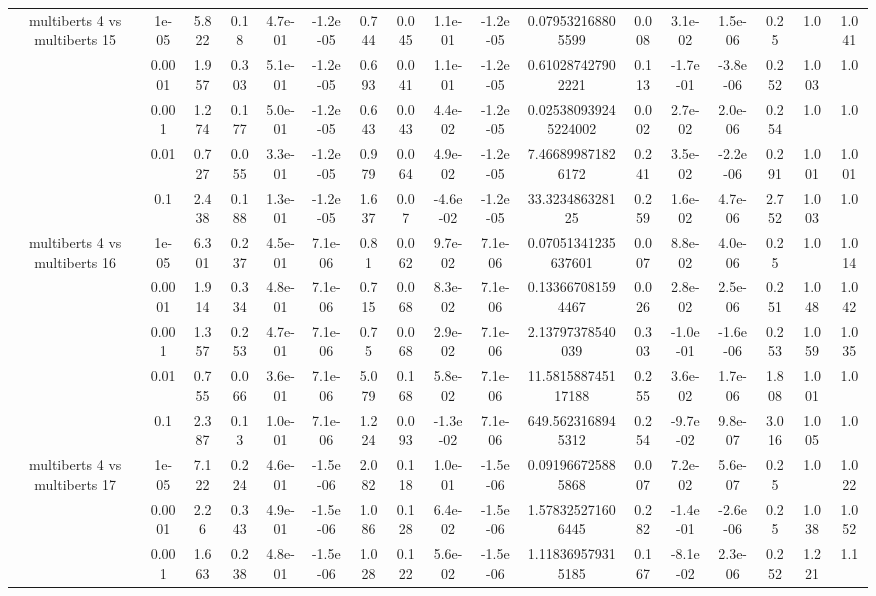 \begin{tabular}{|c|c|c|c|c|c|c|c|c|c|c|c|c|c|c|c|c|}
\hline
\multirow{5}{*}{multiberts 4 vs multiberts 15} & 1e-05 & 5.822 & 0.18 & 4.7e-01 & -1.2e-05 & 0.744 & 0.045 & 1.1e-01 & -1.2e-05 & 0.079532168805599 & 0.008 & 3.1e-02 & 1.5e-06 & 0.25 & 1.0 & 1.041 \\
 & 0.0001 & 1.957 & 0.303 & 5.1e-01 & -1.2e-05 & 0.693 & 0.041 & 1.1e-01 & -1.2e-05 & 0.610287427902221 & 0.113 & -1.7e-01 & -3.8e-06 & 0.252 & 1.003 & 1.0 \\
 & 0.001 & 1.274 & 0.177 & 5.0e-01 & -1.2e-05 & 0.643 & 0.043 & 4.4e-02 & -1.2e-05 & 0.025380939245224002 & 0.002 & 2.7e-02 & 2.0e-06 & 0.254 & 1.0 & 1.0 \\
 & 0.01 & 0.727 & 0.055 & 3.3e-01 & -1.2e-05 & 0.979 & 0.064 & 4.9e-02 & -1.2e-05 & 7.466899871826172 & 0.241 & 3.5e-02 & -2.2e-06 & 0.291 & 1.001 & 1.001 \\
 & 0.1 & 2.438 & 0.188 & 1.3e-01 & -1.2e-05 & 1.637 & 0.07 & -4.6e-02 & -1.2e-05 & 33.323486328125 & 0.259 & 1.6e-02 & 4.7e-06 & 2.752 & 1.003 & 1.0 \\
\hline
\multirow{5}{*}{multiberts 4 vs multiberts 16} & 1e-05 & 6.301 & 0.237 & 4.5e-01 & 7.1e-06 & 0.81 & 0.062 & 9.7e-02 & 7.1e-06 & 0.07051341235637601 & 0.007 & 8.8e-02 & 4.0e-06 & 0.25 & 1.0 & 1.014 \\
 & 0.0001 & 1.914 & 0.334 & 4.8e-01 & 7.1e-06 & 0.715 & 0.068 & 8.3e-02 & 7.1e-06 & 0.133667081594467 & 0.026 & 2.8e-02 & 2.5e-06 & 0.251 & 1.048 & 1.042 \\
 & 0.001 & 1.357 & 0.253 & 4.7e-01 & 7.1e-06 & 0.75 & 0.068 & 2.9e-02 & 7.1e-06 & 2.13797378540039 & 0.303 & -1.0e-01 & -1.6e-06 & 0.253 & 1.059 & 1.035 \\
 & 0.01 & 0.755 & 0.066 & 3.6e-01 & 7.1e-06 & 5.079 & 0.168 & 5.8e-02 & 7.1e-06 & 11.581588745117188 & 0.255 & 3.6e-02 & 1.7e-06 & 1.808 & 1.001 & 1.0 \\
 & 0.1 & 2.387 & 0.13 & 1.0e-01 & 7.1e-06 & 1.224 & 0.093 & -1.3e-02 & 7.1e-06 & 649.5623168945312 & 0.254 & -9.7e-02 & 9.8e-07 & 3.016 & 1.005 & 1.0 \\
\hline
\multirow{5}{*}{multiberts 4 vs multiberts 17} & 1e-05 & 7.122 & 0.224 & 4.6e-01 & -1.5e-06 & 2.082 & 0.118 & 1.0e-01 & -1.5e-06 & 0.091966725885868 & 0.007 & 7.2e-02 & 5.6e-07 & 0.25 & 1.0 & 1.022 \\
 & 0.0001 & 2.26 & 0.343 & 4.9e-01 & -1.5e-06 & 1.086 & 0.128 & 6.4e-02 & -1.5e-06 & 1.578325271606445 & 0.282 & -1.4e-01 & -2.6e-06 & 0.25 & 1.038 & 1.052 \\
 & 0.001 & 1.663 & 0.238 & 4.8e-01 & -1.5e-06 & 1.028 & 0.122 & 5.6e-02 & -1.5e-06 & 1.118369579315185 & 0.167 & -8.1e-02 & 2.3e-06 & 0.252 & 1.221 & 1.1 \\

\end{tabular}
